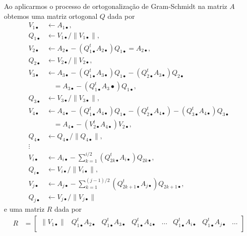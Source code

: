 \documentclass[a4paper,12pt, leqno, answers]{exam}
\newcommand{\mdot}{\bullet}
\begin{document}
\begin{questions}
\begin{solution}
        Ao aplicarmos o processo de ortogonaliza\c{c}\~{a}o de Gram-Schmidt na matriz $A$ obtemos uma matriz ortogonal $Q$ dada por
        \begin{align*}
            V_{1 \mdot} &\leftarrow A_{1 \mdot}, \\
            Q_{1 \mdot} &\leftarrow V_{1 \mdot} / \| V_{1 \mdot} \|, \\
            V_{2 \mdot} &\leftarrow A_{2 \mdot} - \left( Q_{1 \mdot}^t A_{2 \mdot} \right) Q_{1 \mdot} = A_{2 \mdot}, \\
            Q_{2 \mdot} &\leftarrow V_{2 \mdot} / \| V_{2 \mdot}, \\
            V_{3 \mdot} &\leftarrow A_{3 \mdot} - \left( Q_{1 \mdot}^t A_{3 \mdot} \right) Q_{1 \mdot} - \left( Q_{2 \mdot}^t A_{3 \mdot} \right) Q_{2 \mdot} \\
            &\quad = A_{3 \mdot} - \left( Q_{1 \mdot}^t A_{3} \mdot \right) Q_{1 \mdot}, \\
            Q_{3 \mdot} &\leftarrow V_{3 \mdot} / \| V_{3 \mdot} \|, \\
            V_{4 \mdot} &\leftarrow A_{4 \mdot} - \left( Q_{1 \mdot}^t A_{4 \mdot} \right) Q_{1 \mdot} - \left( Q_{2 \mdot}^t A_{4 \mdot} \right) - \left( Q_{3 \mdot}^t A_{4 \mdot} \right) Q_{3 \mdot} \\
            &\quad = A_{4 \mdot} - \left( V_{2 \mdot}^t A_{4 \mdot} \right) V_{2 \mdot}, \\
            Q_{4 \mdot} &\leftarrow Q_{4 \mdot} / \| Q_{4 \mdot} \|, \\
            \vdots \\
            V_{i \mdot} &\leftarrow A_{i \mdot} - \sum_{k = 1}^{i / 2} \left( Q_{2k \mdot}^t A_{i \mdot} \right) Q_{2k \mdot}, \\
            Q_{i \mdot} &\leftarrow V_{i \mdot} / \| V_{i \mdot} \|, \\
            V_{j \mdot} &\leftarrow A_{j \mdot} - \sum_{k = 1}^{(j - 1) / 2} \left( Q_{2k + 1 \mdot}^t A_{j \mdot} \right) Q_{2k + 1 \mdot}, \\
            Q_{j \mdot} &\leftarrow V_{j \mdot} / \| V_{j \mdot} \|
        \end{align*}
        e uma matriz $R$ dada por
        \begin{align*}
            R &= \begin{bmatrix}
                \| V_{1 \mdot} \| & Q_{1 \mdot}^t A_{2 \mdot} & Q_{1 \mdot}^t A_{3 \mdot} & Q_{1 \mdot}^t A_{4 \mdot} & \ldots & Q_{1 \mdot}^t A_{i \mdot} & Q_{1 \mdot}^t A_{j \mdot} & \ldots \\  

\end{bmatrix}
\end{align*}
\end{solution}
\end{questions}
\end{document}
